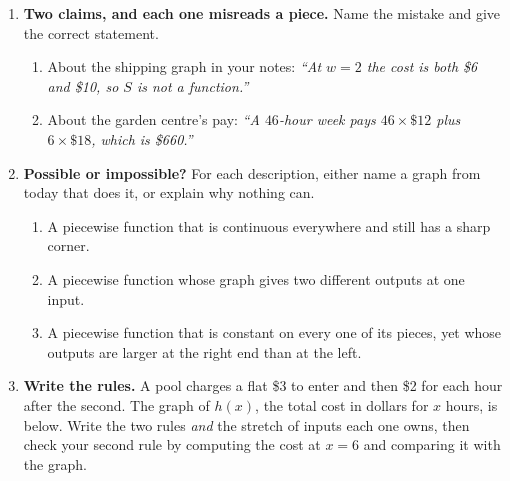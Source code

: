 \documentclass[10pt]{article}
\begin{document}
\boxguard[30]
\begin{tcolorbox}[colback=white, colframe=black!40, title=\textbf{Tier E --- Extension},
    fonttitle=\bfseries, arc=2mm, left=3mm, right=3mm, top=2mm, bottom=2mm, breakable]
\small

\begin{enumerate}[leftmargin=1.6em, itemsep=4pt, topsep=2pt]
  \item \textbf{Two claims, and each one misreads a piece.} Name the mistake and give the correct
        statement.
        \begin{enumerate}[label=(\alph*), leftmargin=1.6em, itemsep=3pt, topsep=3pt]
          \item About the shipping graph in your notes: \emph{``At $w=2$ the cost is both \$6 and
                \$10, so $S$ is not a function.''}


          \item About the garden centre's pay: \emph{``A $46$-hour week pays $46 \times \$12$ plus
                $6 \times \$18$, which is \$660.''}

        \end{enumerate}

  \item \textbf{Possible or impossible?} For each description, either name a graph from today that
        does it, or explain why nothing can.
        \begin{enumerate}[label=(\alph*), leftmargin=1.6em, itemsep=3pt, topsep=3pt]
          \item A piecewise function that is continuous everywhere and still has a sharp corner.


          \item A piecewise function whose graph gives two different outputs at one input.


          \item A piecewise function that is constant on every one of its pieces, yet whose outputs
                are larger at the right end than at the left.

        \end{enumerate}

  \item \textbf{Write the rules.} A pool charges a flat \$3 to enter and then \$2 for each hour after
        the second. The graph of $h(x)$, the total cost in dollars for $x$ hours, is below. Write the
        two rules \emph{and} the stretch of inputs each one owns, then check your second rule by
        computing the cost at $x=6$ and comparing it with the graph.


\end{enumerate}
\end{tcolorbox}
\end{document}
